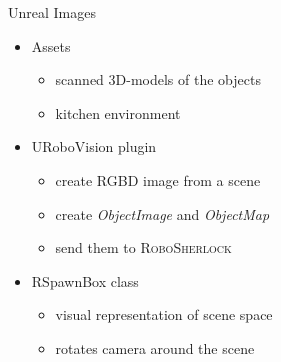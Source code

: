 \documentclass[]{beamer}
\begin{document}
\begin{frame}{Unreal Images}
	\begin{itemize}
		\item Assets
			\begin{itemize}
				\item scanned 3D-models of the objects
				\item kitchen environment
			\end{itemize}
		\item URoboVision plugin
			\begin{itemize}
				\item create RGBD image from a scene
				\item create \textit{ObjectImage} and  \textit{ObjectMap} 
				\item send them to \textsc{RoboSherlock}
			\end{itemize}
		\item RSpawnBox class
			\begin{itemize}
				\item visual representation of scene space
				\item rotates camera around the scene
			\end{itemize}
	\end{itemize}
\end{frame}
\end{document}
